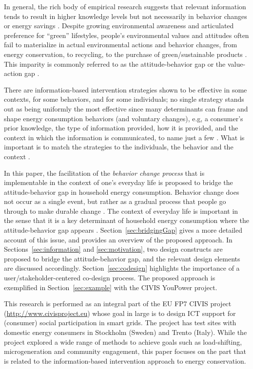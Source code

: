 \documentclass[a4paper]{article}
\begin{document}
In general, the rich body of empirical research suggests that relevant information tends to result in higher knowledge levels but not necessarily in behavior changes or energy savings \citep{Abrahamse2005,+}. Despite growing environmental awareness and articulated preference for ``green'' lifestyles, people's environmental values and attitudes often fail to materialize in actual environmental actions and behavior changes, from energy conservation, to recycling,  to the purchase of green/sustainable products \citep{Schultz2002,Abrahamse2005,Claudy2013}. This imparity is commonly referred to as the attitude-behavior gap or the value-action gap \citep{Blake1999,Kollmuss2002,Claudy2013}. 

There are information-based intervention strategies shown to be effective in some contexts, for some behaviors, and for some individuals; no single strategy stands out as being uniformly the most effective \citep{Schultz2014} since many determinants can frame and shape energy consumption behaviors (and voluntary changes), e.g, a consumer's prior knowledge, the type of information provided, how it is provided, and the context in which the information is communicated, to name just a few \citep{Delmas2013,+}. What is important is to match the strategies to the individuals, the behavior and the context \citep{Schultz2014}. 

In this paper, the facilitation of the \textit{behavior change process} that is implementable in the context of one's everyday life is proposed to bridge the attitude-behavior gap in household energy consumption. Behavior change does not occur as a single event, but rather as a gradual process that people go through to make durable change \citep{Niedderer2014}. The context of everyday life is important in the sense that it is a key determinant of household energy consumption where the attitude-behavior gap appears \citep{Burchell2014,Selvefors2015}. Section~\ref{sec:bridgingGap} gives a more detailed account of this issue, and provides an overview of the proposed approach. In Sections~\ref{sec:information} and \ref{sec:motivation}, two design constructs are proposed to bridge the attitude-behavior gap, and the relevant design elements are discussed accordingly. Section~\ref{sec:codesign} highlights the importance of a user/stakeholder-centered co-design process. The proposed approach is exemplified in Section~\ref{sec:example} with the CIVIS YouPower project.

This research is performed as an integral part of the EU FP7 CIVIS project (\url{http://www.civisproject.eu}) whose goal in large is to design ICT support for (consumer) social participation in smart grids. The project has test sites with domestic energy consumers in Stockholm (Sweden) and Trento (Italy). While the project explored a wide range of methods to achieve goals such as load-shifting, microgeneration and community engagement, this paper focuses on the part that is related to the information-based intervention approach to energy conservation.
\end{document}
